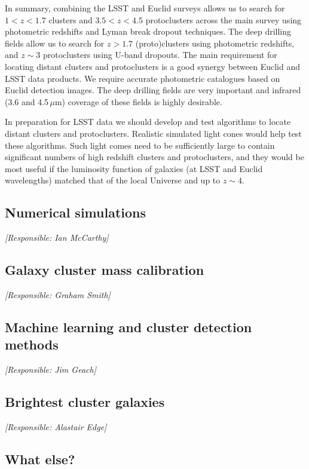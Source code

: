 \documentclass[a4paper,11pt]{article}
\begin{document}
In summary, combining the LSST and Euclid surveys allows us to search for $1<z<1.7$ clusters and $3.5<z<4.5$ protoclusters across the main survey using photometric redshifts and Lyman break dropout techniques. The deep drilling fields allow us to search for $z>1.7$ (proto)clusters using photometric redshifts, and $z\sim3$ protoclusters using U-band dropouts. The main requirement for locating distant clusters and protoclusters is a good synergy between Euclid and LSST data products. We require accurate photometric catalogues based on Euclid detection images. The deep drilling fields are very important and infrared (3.6 and 4.5\,$\mu$m) coverage of these fields is highly desirable.

In preparation for LSST data we should develop and test algorithms to locate distant clusters and protoclusters. Realistic simulated light cones would help test these algorithms. Such light comes need to be sufficiently large to contain significant numbers of high redshift clusters and protoclusters, and they would be most useful if the luminosity function of galaxies (at LSST and Euclid wavelengths) matched that of the local Universe and up to $z\sim4$.

\subsection{Numerical simulations}

{\it [Responsible: Ian McCarthy]}

\subsection{Galaxy cluster mass calibration}

{\it [Responsible: Graham Smith]}

\subsection{Machine learning and cluster detection methods}

{\it [Responsible: Jim Geach]}

\subsection{Brightest cluster galaxies}

{\it [Responsible: Alastair Edge]}

\subsection{What else?}
\end{document}
